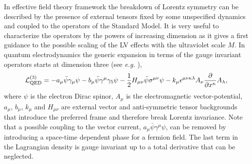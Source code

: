\documentclass[12pt]{revtex4}
\begin{document}
In effective field theory framework the breakdown of Lorentz 
symmetry can be described by the presence of external tensors fixed 
by some unspecified dynamics and coupled to the operators of the
Standard Model. It is very useful to characterize the operators by the powers 
of increasing dimension as it gives a first guidance to the 
possible scaling of the LV effects with the ultraviolet scale $M$. 
In quantum electrodynamics the generic expansion
in terms of the gauge invariant operators starts at dimension three (see {\em e.g.}
\cite{Kost1}),
\begin{equation}
{\cal L}_{\rm QED}^{(3)} =
-a_\mu \bar \psi \gamma_\mu \psi
- b_\mu \bar \psi \gamma^\mu \gamma_5 \psi - \frac{1}{2}H_{\mu\nu}\bar
\psi \sigma^{\mu\nu} \psi - k_\mu \epsilon^{\mu\nu\kappa\lambda}
A_\nu \frac{\partial}{\partial x^\kappa} A_\lambda, 
\label{LVqed}
\end{equation}
where $\psi$ is the electron Dirac spinor, $A_\mu$ is the
electromagnetic vector-potential, $a_{\mu}$,
$b_\mu$, $k_\mu$ and $H_{\mu\nu}$ are external vector and
anti-symmetric tensor backgrounds that introduce the preferred
frame and therefore break Lorentz invariance. Note that a possible
coupling to the vector current, $a_\mu \bar \psi \gamma^\mu \psi$,
can be removed by introducing a space-time dependent phase for a
fermion field. The last term in the Lagrangian density is gauge
invariant up to a total derivative that can be neglected. 
\end{document}
